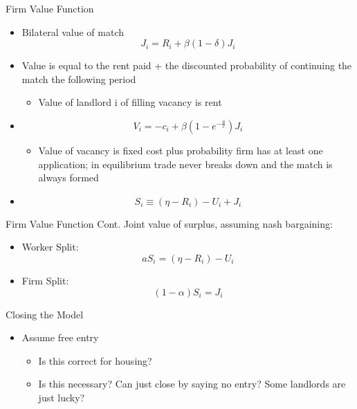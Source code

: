 \documentclass[10pt, xcolor=dvipsnames]{beamer}
\begin{document}
\begin{frame}{Firm Value Function}
    \begin{itemize}
    \item Bilateral value of match \begin{equation}
        J_i = R_i + \beta(1 - \delta)J_i
    \end{equation} 
    \item Value is equal to the rent paid + the discounted probability of continuing the match the following period 
    \begin{itemize}
        \item Value of landlord i of filling vacancy is rent
    \end{itemize}
    \item \begin{equation}\label{eq:job-value}
        V_i = -c_i + \beta(1  - e^{-\frac{u}{v}})J_i
    \end{equation}
    \begin{itemize}
        \item Value of vacancy is fixed cost plus probability firm has at least one application; in equilibrium trade never breaks down and the match is always formed 
    \end{itemize}
    \item \begin{equation}\label{eq:surplus-value}
        S_i \equiv (\eta - R_i) - U_i + J_i
    \end{equation}
    \end{itemize}
\end{frame}

\begin{frame}{Firm Value Function Cont.}
Joint value of surplus, assuming nash bargaining:
    \begin{itemize}
        \item Worker Split: \begin{equation}\label{eq:nash-worker}
            aS_i = (\eta - R_i) - U_i
        \end{equation}
        \item Firm Split: \begin{equation}
            (1-\alpha)S_i = J_i
        \end{equation}
    \end{itemize}
\end{frame}

\begin{frame}{Closing the Model}
    \begin{itemize}
    \item Assume free entry
    \begin{itemize}
        \item Is this correct for housing?
        \item Is this necessary? Can just close by saying no entry? Some landlords are just lucky?
    \end{itemize}
\end{itemize}
\end{frame}
\end{document}

